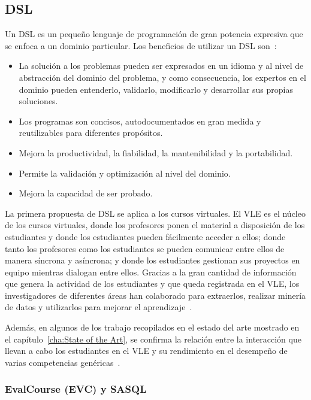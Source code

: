 	\subsection{DSL}

		Un DSL es un pequeño lenguaje de programación de gran potencia expresiva que se enfoca a un dominio particular. Los beneficios de utilizar un DSL son~\cite{vanDeursen:2000}:
		\begin{itemize}
			\item La solución a los problemas pueden ser expresados en un idioma y al nivel de abstracción del dominio del problema, y como consecuencia, los expertos en el dominio pueden entenderlo, validarlo, modificarlo y desarrollar sus propias soluciones.
			\item Los programas son concisos, autodocumentados en gran medida y reutilizables para diferentes propósitos.
			\item Mejora la productividad, la fiabilidad, la mantenibilidad y la portabilidad.
			\item Permite la validación y optimización al nivel del dominio.
			\item Mejora la capacidad de ser probado.
		\end{itemize} 

		La primera propuesta de DSL se aplica a los cursos virtuales. El VLE es el núcleo de los cursos virtuales, donde los profesores ponen el material a disposición de los estudiantes y donde los estudiantes pueden fácilmente acceder a ellos; donde tanto los profesores como los estudiantes se pueden comunicar entre ellos de manera síncrona y asíncrona; y donde los estudiantes gestionan sus proyectos en equipo mientras dialogan entre ellos. Gracias a la gran cantidad de información que genera la actividad de los estudiantes y que queda registrada en el VLE, los investigadores de diferentes áreas han colaborado para extraerlos, realizar minería de datos y utilizarlos para mejorar el aprendizaje~\cite{park2015development}.

		Además, en algunos de los trabajo recopilados en el estado del arte mostrado en el capítulo~\ref{cha:State of the Art}, se confirma la relación entre la interacción que llevan a cabo los estudiantes en el VLE y su rendimiento en el desempeño de varias competencias genéricas~\cite{fidalgo:2015,rayon2014web}. 

		\subsubsection{EvalCourse (EVC) y SASQL}

